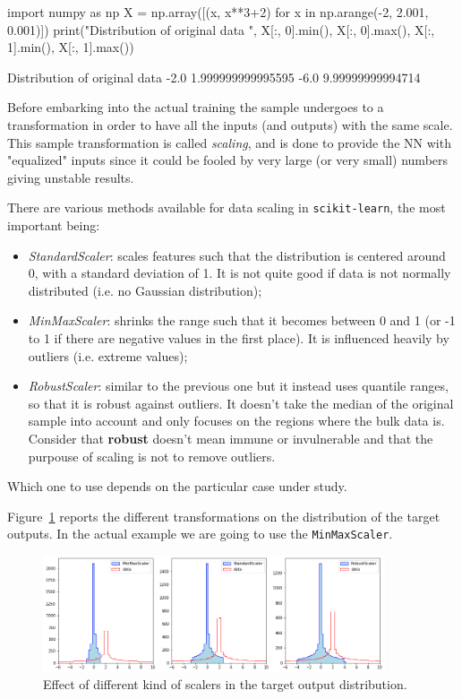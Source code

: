\begin{ipython}
import numpy as np
X = np.array([(x, x**3+2) for x in np.arange(-2, 2.001, 0.001)])
print("Distribution of original data ", X[:, 0].min(), X[:, 0].max(), 
X[:, 1].min(), X[:, 1].max())
\end{ipython}
\begin{ioutput}
Distribution of original data  -2.0 1.999999999995595 -6.0 9.99999999994714
\end{ioutput}

Before embarking into the actual training the sample undergoes to a transformation in order to have all the inputs (and outputs) with the same scale. This sample transformation is called \emph{scaling}, and is done to provide the NN with "equalized" inputs since it could be fooled by very large (or very small) numbers giving unstable results.

There are various methods available for data scaling in \texttt{scikit-learn}, the most important being:
\begin{itemize}
\tightlist
\item \emph{StandardScaler}: scales features such that the distribution is centered around 0, with a standard deviation of 1. It is not quite good if data is not normally distributed (i.e. no Gaussian distribution);
\item \emph{MinMaxScaler}: shrinks the range such that it becomes between 0 and 1 (or -1 to 1 if there are negative values in the first place). It is influenced heavily by outliers (i.e. extreme values);
\item \emph{RobustScaler}: similar to the previous one but it instead uses quantile ranges, so that it is robust against outliers. It doesn't take the median of the original sample into account and only focuses on the regions where the bulk data is. Consider that \textbf{robust} doesn't mean immune or invulnerable and that the purpouse of scaling is not to remove outliers.
\end{itemize}

Which one to use depends on the particular case under study. 

Figure~\ref{fig:scalers} reports the different transformations on the distribution of the target outputs. In the actual example we are going to use the \texttt{MinMaxScaler}.

\begin{figure}[htb]
\centering
\includegraphics[width=0.9\textwidth]{figures/scalers}
\caption{Effect of different kind of scalers in the target output distribution.}
\label{fig:scalers}
\end{figure}

